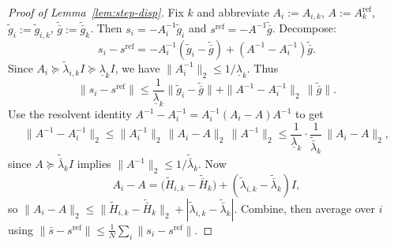 \documentclass[review,onefignum,onetabnum]{siamart171218}
\begin{document}
\begin{proof}[Proof of Lemma~\ref{lem:step-disp}]
Fix $k$ and abbreviate $A_i:=A_{i,k}$, $A:=A_k^{\mathrm{ref}}$, $\tilde g_i:=\tilde g_{i,k}$, $\tilde{\bar g}:=\tilde{\bar g}_k$.
Then $s_i=-A_i^{-1}\tilde g_i$ and $s^{\mathrm{ref}}=-A^{-1}\tilde{\bar g}$.
Decompose:
\[
s_i-s^{\mathrm{ref}}
=-A_i^{-1}(\tilde g_i-\tilde{\bar g}) + (A^{-1}-A_i^{-1})\tilde{\bar g}.
\]
Since $A_i\succeq \tilde\lambda_{i,k}I\succeq \underline\lambda_k I$, we have $\|A_i^{-1}\|_2\le 1/\underline\lambda_k$.
Thus
\[
\|s_i-s^{\mathrm{ref}}\|
\le \frac1{\underline\lambda_k}\|\tilde g_i-\tilde{\bar g}\|+\|A^{-1}-A_i^{-1}\|_2\,\|\tilde{\bar g}\|.
\]
Use the resolvent identity $A^{-1}-A_i^{-1}=A_i^{-1}(A_i-A)A^{-1}$ to get
\[
\|A^{-1}-A_i^{-1}\|_2\le \|A_i^{-1}\|_2\,\|A_i-A\|_2\,\|A^{-1}\|_2
\le \frac1{\underline\lambda_k}\cdot \frac1{\tilde{\bar\lambda}_k}\,\|A_i-A\|_2,
\]
since $A\succeq \tilde{\bar\lambda}_k I$ implies $\|A^{-1}\|_2\le 1/\tilde{\bar\lambda}_k$.
Now
\[
A_i-A=\big(\tilde H_{i,k}-\tilde{\bar H}_k\big)+(\tilde\lambda_{i,k}-\tilde{\bar\lambda}_k)I,
\]
so $\|A_i-A\|_2\le \|\tilde H_{i,k}-\tilde{\bar H}_k\|_2+|\tilde\lambda_{i,k}-\tilde{\bar\lambda}_k|$.
Combine, then average over $i$ using $\|\bar s-s^{\mathrm{ref}}\|\le \frac1N\sum_i\|s_i-s^{\mathrm{ref}}\|$.
\end{proof}
\end{document}
